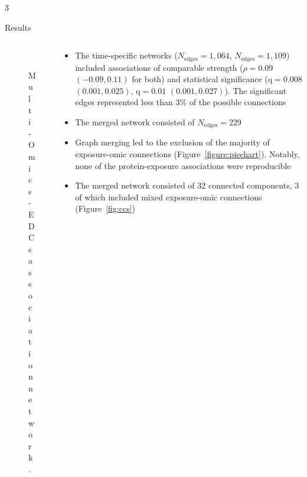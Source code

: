 \documentclass[final]{beamer}
\newlength{\colwidth}
\begin{document}
\begin{frame}[t]
\begin{columns}[t]
\begin{column}{3\colwidth}
  \begin{block}{Results}
  \begin{columns}
  
	\begin{column}{0.2\textwidth}
		
		\begin{figure}
			\centering
			\\
			\caption{Multi-Omics - EDCs association network.}
		\end{figure}				
		
	\end{column}
	
	\begin{column}{0.8\textwidth}
	
		\begin{itemize}
			\item The time-specific networks ($N_{\text{edges}}=1,064$, $N_{\text{edges}}=1,109$) included associations of comparable strength ($\rho = 0.09$ $(-0.09, 0.11)$ for both) and statistical significance ($\text{q} = 0.008$ $(0.001, 0.025)$, $\text{q} = 0.01$ $(0.001, 0.027)$). The significant edges represented less than $3\%$ of the possible connections
			\item The merged network consisted of $N_{\text{edges}}=229$
			\item Graph merging led to the exclusion of the majority of exposure-omic connections (Figure~\ref{figure:piechart}). Notably, none of the protein-exposure associations were reproducible
			\item The merged network consisted of $32$ connected components, $3$ of which included mixed exposure-omic connections (Figure~\ref{fig:ccs})
		\end{itemize}			
	

\end{column}
\end{columns}
\end{block}
\end{column}
\end{columns}
\end{frame}
\end{document}
